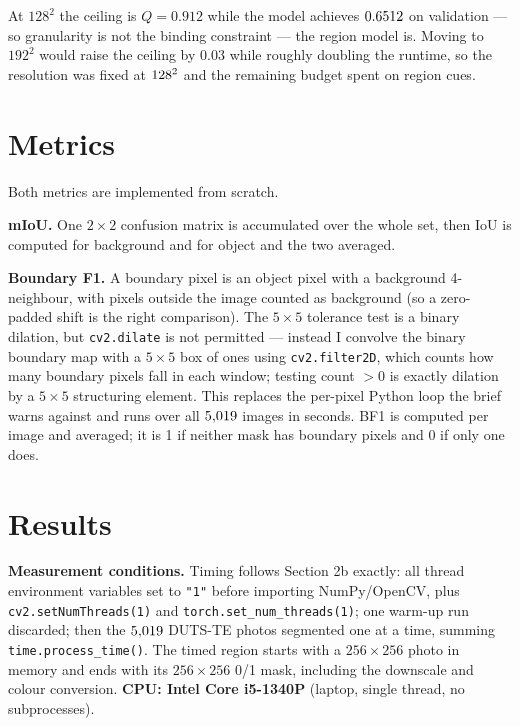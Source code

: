 \documentclass[11pt,a4paper]{article}
\begin{document}
At $128^2$ the ceiling is $Q=0.912$ while the model achieves $0.6512$ on validation ---
so granularity is not the binding constraint --- the region model is. Moving to $192^2$
would raise the ceiling by $0.03$ while roughly doubling the runtime, so the resolution
was fixed at $128^2$ and the remaining budget spent on region cues.

\section{Metrics}
Both metrics are implemented from scratch.

\textbf{mIoU.} One $2\times2$ confusion matrix is accumulated over the whole set, then
IoU is computed for background and for object and the two averaged.

\textbf{Boundary F1.} A boundary pixel is an object pixel with a background 4-neighbour,
with pixels outside the image counted as background (so a zero-padded shift is the right
comparison). The $5\times5$ tolerance test is a binary dilation, but \texttt{cv2.dilate}
is not permitted --- instead I convolve the binary boundary map with a $5\times5$ box of
ones using \texttt{cv2.filter2D}, which counts how many boundary pixels fall in each
window; testing count $>0$ is exactly dilation by a $5\times5$ structuring element. This
replaces the per-pixel Python loop the brief warns against and runs over all $5{,}019$
images in seconds. BF1 is computed per image and averaged; it is 1 if neither mask has
boundary pixels and 0 if only one does.

\section{Results}

\textbf{Measurement conditions.} Timing follows Section 2b exactly: all thread
environment variables set to \texttt{"1"} before importing NumPy/OpenCV, plus
\texttt{cv2.setNumThreads(1)} and \texttt{torch.set\_num\_threads(1)}; one warm-up run
discarded; then the $5{,}019$ DUTS-TE photos segmented one at a time, summing
\texttt{time.process\_time()}. The timed region starts with a $256\times256$ photo in
memory and ends with its $256\times256$ 0/1 mask, including the downscale and colour
conversion. \textbf{CPU: Intel Core i5-1340P} (laptop, single thread, no subprocesses).
\end{document}
